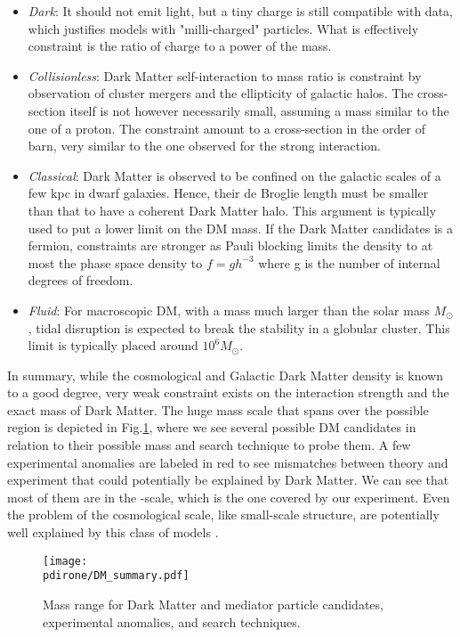 \begin{itemize}
\item \textit{Dark}: It should not emit light, but a tiny charge is still compatible with data, which justifies models with "milli-charged" particles. What is effectively constraint is the ratio of charge to a power of the mass.
\item \textit{Collisionless}: Dark Matter self-interaction to mass ratio is constraint by observation of cluster mergers and the ellipticity of galactic halos. The cross-section itself is not however necessarily small, assuming a mass similar to the one of a proton. The constraint amount to a cross-section in the order of barn, very similar to the one observed for the strong interaction.
\item \textit{Classical}: Dark Matter is observed to be confined on the galactic scales of a few kpc in dwarf galaxies. Hence, their de Broglie length must be smaller than that to have a coherent Dark Matter halo. This argument is typically used to put a lower limit on the DM mass. If the Dark Matter candidates is a fermion, constraints are stronger as Pauli blocking limits the density to at most the phase space density to $f=gh^{-3}$ where g is the number of internal degrees of freedom.
\item \textit{Fluid}: For macroscopic DM, with a mass much larger than the solar mass $M_{\odot}$, tidal disruption is expected to break the stability in a globular cluster. This limit is typically placed around $10^6 M_{\odot}$.
\end{itemize}

In summary, while the cosmological and Galactic Dark Matter density is known to a good degree, very weak constraint exists on the interaction strength and the exact mass of Dark Matter. The huge mass scale that spans over the possible region is depicted in Fig.\ref{fig:dm-mass-range}, where we see several possible DM candidates in relation to their possible mass and search technique to probe them. A few experimental anomalies are labeled in red to see mismatches between theory and experiment that could potentially be explained by Dark Matter. We can see that most of them are in the \mev-\gev scale, which is the one covered by our experiment. Even the problem of the cosmological scale, like small-scale structure, are potentially well explained by this class of models \cite{battaglieri2017cosmic}.

\begin{figure}[bht!]
  \centering
  \texttt{[image: \\pdirone/DM\_summary.pdf]}
  \caption[Mass range for Dark Matter]{Mass range for Dark Matter and mediator particle candidates, experimental anomalies, and search techniques.}
  \label{fig:dm-mass-range}
\end{figure}


